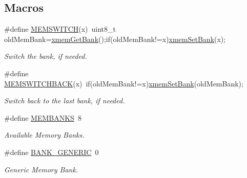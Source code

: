 \subsection*{Macros}
\begin{DoxyCompactItemize}
\item 
\#define \hyperlink{group__xmem_ga253830e5022f2aa99177acd8a0ba0bfe}{M\-E\-M\-S\-W\-I\-T\-C\-H}(x)~uint8\-\_\-t old\-Mem\-Bank=\hyperlink{group__xmem_ga575f63170f6fc636556f8d955cbd42cd}{xmem\-Get\-Bank}();if(old\-Mem\-Bank!=x)\hyperlink{group__xmem_ga619fa66b9f38be684f4331951fc91730}{xmem\-Set\-Bank}(x);
\begin{DoxyCompactList}\small\item\em Switch the bank, if needed. \end{DoxyCompactList}\item 
\#define \hyperlink{group__xmem_ga96199c8c5e6fbc65dd60aa67de63fd34}{M\-E\-M\-S\-W\-I\-T\-C\-H\-B\-A\-C\-K}(x)~if(old\-Mem\-Bank!=x)\hyperlink{group__xmem_ga619fa66b9f38be684f4331951fc91730}{xmem\-Set\-Bank}(old\-Mem\-Bank);
\begin{DoxyCompactList}\small\item\em Switch back to the last bank, if needed. \end{DoxyCompactList}\item 
\#define \hyperlink{group__xmem_ga1ed280cb3dd0a4a03aeda6aaccc180d3}{M\-E\-M\-B\-A\-N\-K\-S}~8
\begin{DoxyCompactList}\small\item\em Available Memory Banks. \end{DoxyCompactList}\item 
\#define \hyperlink{group__xmem_ga6b1167d0078b33af8ec17ededaebe0cb}{B\-A\-N\-K\-\_\-\-G\-E\-N\-E\-R\-I\-C}~0
\begin{DoxyCompactList}\small\item\em Generic Memory Bank. \end{DoxyCompactList}\end{DoxyCompactItemize}
